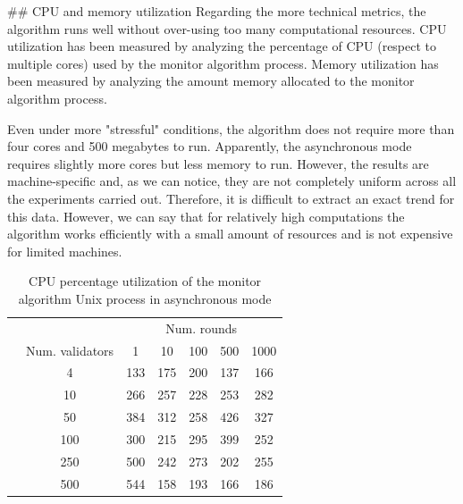 \documentclass[a4paper,11pt,oneside]{report}
\begin{document}
\begin{markdown}

## CPU and memory utilization
Regarding the more technical metrics, the algorithm runs well without over-using too many computational resources.
CPU utilization has been measured by analyzing the percentage of CPU (respect to multiple cores) used by the monitor algorithm process.
Memory utilization has been measured by analyzing the amount memory allocated to the monitor algorithm process.

Even under more "stressful" conditions, the algorithm does not require more than four cores and 500 megabytes to run.  
Apparently, the asynchronous mode requires slightly more cores but less memory to run. However, the results are machine-specific and, as we can notice, they are not completely uniform across all the experiments carried out. 
Therefore, it is difficult to extract an exact trend for this data. However, we can say that for relatively high computations the algorithm works efficiently with a small amount of resources and is not expensive for limited machines.

\end{markdown}


\begin{table}[]
\centering
\begin{tabular}{l|c|c|c|c|c|c|}
\cline{2-7}
                  &   & \multicolumn{5}{c|}{Num. rounds} \\ \cline{2-7} 
\multirow{7}{*}{} & Num. validators & 1   & 10   & 100  & 500  & 1000  \\ \cline{2-7} 
                  & 4               & 133 & 175  & 200 & 137  & 166       \\ \cline{2-7} 
                  & 10              & 266   & 257   & 228  & 253  &  282     \\ \cline{2-7} 
                  & 50              & 384    & 312     & 258      &  426    & 327      \\ \cline{2-7} 
                  & 100             & 300    & 215     & 295     & 399     &   252    \\ \cline{2-7} 
                  & 250             & 500    &  242    & 273     & 202      & 255      \\ \cline{2-7} 
                  & 500             &  544   &  158    & 193     &  166    &  186     \\ \cline{2-7} 
\end{tabular}
\caption{CPU percentage utilization of the monitor algorithm Unix process in asynchronous mode}
\end{table}
\end{document}
